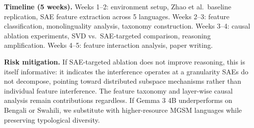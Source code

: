 \documentclass[10pt,twocolumn,a4paper]{article}
\begin{document}
\textbf{Timeline (5 weeks).} Weeks 1--2: environment setup, Zhao et al.\ baseline replication, SAE feature extraction across 5 languages. Weeks 2--3: feature classification, monolinguality analysis, taxonomy construction. Weeks 3--4: causal ablation experiments, SVD vs.\ SAE-targeted comparison, reasoning amplification. Weeks 4--5: feature interaction analysis, paper writing.

\textbf{Risk mitigation.} If SAE-targeted ablation does not improve reasoning, this is itself informative: it indicates the interference operates at a granularity SAEs do not decompose, pointing toward distributed subspace mechanisms rather than individual feature interference. The feature taxonomy and layer-wise causal analysis remain contributions regardless. If Gemma 3 4B underperforms on Bengali or Swahili, we substitute with higher-resource MGSM languages while preserving typological diversity.
\end{document}
